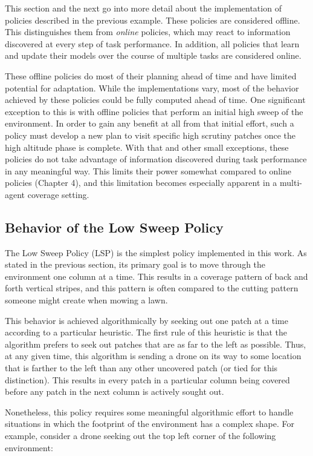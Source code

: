 This section and the next go into more detail about the implementation of policies described in the previous example. These policies are considered offline. This distinguishes them from \textit{online} policies, which may react to information discovered at every step of task performance. In addition, all policies that learn and update their models over the course of multiple tasks are considered online.

These offline policies do most of their planning ahead of time and have limited potential for adaptation. While the implementations vary, most of the behavior achieved by these policies could be fully computed ahead of time. One significant exception to this is with offline policies that perform an initial high sweep of the environment. In order to gain any benefit at all from that initial effort, such a policy must develop a new plan to visit specific high scrutiny patches once the high altitude phase is complete. With that and other small exceptions, these policies do not take advantage of information discovered during task performance in any meaningful way. This limits their power somewhat compared to online policies (Chapter 4), and this limitation becomes especially apparent in a multi-agent coverage setting.

\subsection{Behavior of the Low Sweep Policy}

The Low Sweep Policy (LSP) is the simplest policy implemented in this work. As stated in the previous section, its primary goal is to move through the environment one column at a time. This results in a coverage pattern of back and forth vertical stripes, and this pattern is often compared to the cutting pattern someone might create when mowing a lawn. 

This behavior is achieved algorithmically by seeking out one patch at a time according to a particular heuristic. The first rule of this heuristic is that the algorithm prefers to seek out patches that are as far to the left as possible. Thus, at any given time, this algorithm is sending a drone on its way to some location that is farther to the left than any other uncovered patch (or tied for this distinction). This results in every patch in a particular column being covered before any patch in the next column is actively sought out.

Nonetheless, this policy requires some meaningful algorithmic effort to handle situations in which the footprint of the environment has a complex shape. For example, consider a drone seeking out the top left corner of the following environment:


